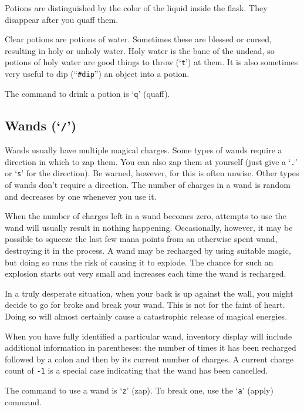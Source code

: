\documentclass[titlepage]{article}
\begin{document}
Potions are distinguished by the color of the liquid inside the flask.
They disappear after you quaff them.

Clear potions are potions of water.  Sometimes these are
blessed or cursed, resulting in holy or unholy water.  Holy water is
the bane of the undead, so potions of holy water are good things to
throw (`\texttt{t}') at them.  It is also sometimes very useful to dip
(``\texttt{\#dip}'') an object into a potion.

The command to drink a potion is `\texttt{q}' (quaff).

\subsection*{Wands (`\texttt{/}')}

Wands usually have multiple magical charges.
Some types of wands require a direction in which to zap them.
You can also
zap them at yourself (just give a `\texttt{.}' or `\texttt{s}' for the direction).
Be warned, however, for this is often unwise.
Other types of wands
don't require a direction.  The number of charges in a
wand is random and decreases by one whenever you use it.

When the number of charges left in a wand becomes zero, attempts to use the
wand will usually result in nothing happening.  Occasionally, however, it may
be possible to squeeze the last few mana points from an otherwise spent wand,
destroying it in the process.  A wand may be recharged by using suitable
magic, but doing so runs the risk of causing it to explode.  The chance
for such an explosion starts out very small and increases each time the
wand is recharged.

In a truly desperate situation, when your back is up against the wall, you
might decide to go for broke and break your wand.  This is not for the faint
of heart.  Doing so will almost certainly cause a catastrophic release of
magical energies.

When you have fully identified a particular wand, inventory display will
include additional information in parentheses: the number of times it has
been recharged followed by a colon and then by its current number of charges.
A current charge count of \texttt{-1} is a special case indicating that the wand
has been cancelled.

The command to use a wand is `\texttt{z}' (zap).  To break one, use the `\texttt{a}'
(apply) command.
\end{document}
